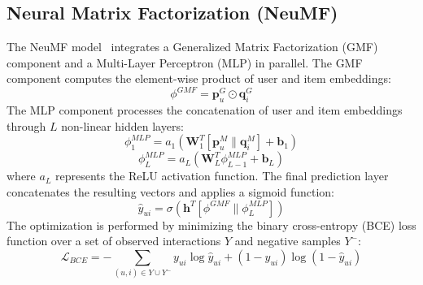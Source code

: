 \documentclass[journal]{IEEEtran}
\begin{document}
\subsection{Neural Matrix Factorization (NeuMF)}
The NeuMF model~\cite{he2017neural} integrates a Generalized Matrix Factorization (GMF) component and a Multi-Layer Perceptron (MLP) in parallel. The GMF component computes the element-wise product of user and item embeddings:
\begin{equation}
\phi^{GMF} = \mathbf{p}_u^G \odot \mathbf{q}_i^G
\end{equation}
The MLP component processes the concatenation of user and item embeddings through $L$ non-linear hidden layers:
\begin{equation}
\phi_1^{MLP} = a_1(\mathbf{W}_1^T [\mathbf{p}_u^M \parallel \mathbf{q}_i^M] + \mathbf{b}_1)
\end{equation}
\begin{equation}
\phi_L^{MLP} = a_L(\mathbf{W}_L^T \phi_{L-1}^{MLP} + \mathbf{b}_L)
\end{equation}
where $a_L$ represents the ReLU activation function. The final prediction layer concatenates the resulting vectors and applies a sigmoid function:
\begin{equation}
\hat{y}_{ui} = \sigma(\mathbf{h}^T [\phi^{GMF} \parallel \phi_L^{MLP}])
\end{equation}
The optimization is performed by minimizing the binary cross-entropy (BCE) loss function over a set of observed interactions $Y$ and negative samples $Y^-$:
\begin{equation}
\mathcal{L}_{BCE} = -\sum_{(u, i) \in Y \cup Y^-} y_{ui} \log \hat{y}_{ui} + (1 - y_{ui}) \log (1 - \hat{y}_{ui})
\end{equation}
\end{document}
